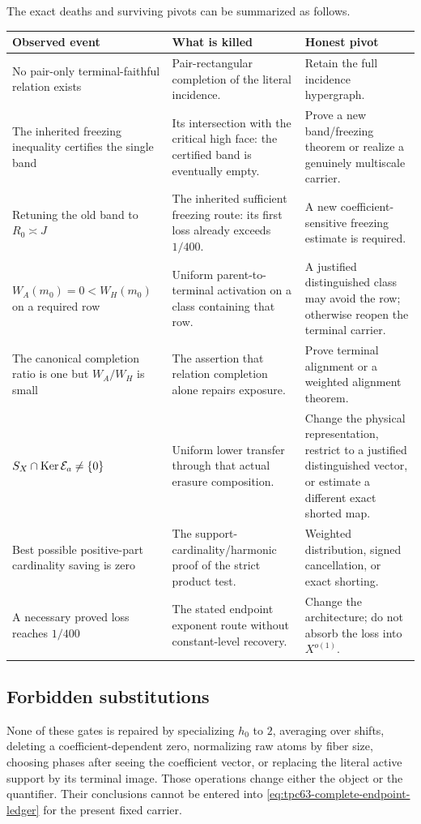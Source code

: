 The exact deaths and surviving pivots can be summarized as follows.
\begin{center}
\small
\begin{tabular}{>{\raggedright\arraybackslash}p{}
                >{\raggedright\arraybackslash}p{}
                >{\raggedright\arraybackslash}p{}}
\toprule
Observed event & What is killed & Honest pivot\\
\midrule
No pair-only terminal-faithful relation exists
& Pair-rectangular completion of the literal incidence.
& Retain the full incidence hypergraph.\\
\addlinespace
The inherited freezing inequality certifies the single band
& Its intersection with the critical high face: the certified band is
  eventually empty.
& Prove a new band/freezing theorem or realize a genuinely multiscale
  carrier.\\
\addlinespace
Retuning the old band to \(R_0\asymp J\)
& The inherited sufficient freezing route: its first loss already exceeds
  \(1/400\).
& A new coefficient-sensitive freezing estimate is required.\\
\addlinespace
\(W_A(m_0)=0<W_H(m_0)\) on a required row
& Uniform parent-to-terminal activation on a class containing that row.
& A justified distinguished class may avoid the row; otherwise reopen the
  terminal carrier.\\
\addlinespace
The canonical completion ratio is one but \(W_A/W_H\) is small
& The assertion that relation completion alone repairs exposure.
& Prove terminal alignment or a weighted alignment theorem.\\
\addlinespace
\(S_X\cap\operatorname{Ker}\mathcal E_a\ne\{0\}\)
& Uniform lower transfer through that actual erasure composition.
& Change the physical representation, restrict to a justified
  distinguished vector, or estimate a different exact shorted map.\\
\addlinespace
Best possible positive-part cardinality saving is zero
& The support-cardinality/harmonic proof of the strict product test.
& Weighted distribution, signed cancellation, or exact shorting.\\
\addlinespace
A necessary proved loss reaches \(1/400\)
& The stated endpoint exponent route without constant-level recovery.
& Change the architecture; do not absorb the loss into \(X^{o(1)}\).\\
\bottomrule
\end{tabular}
\end{center}

\subsection{Forbidden substitutions}

None of these gates is repaired by specializing \(h_0\) to \(2\),
averaging over shifts, deleting a coefficient-dependent zero, normalizing
raw atoms by fiber size, choosing phases after seeing the coefficient
vector, or replacing the literal active support by its terminal image.
Those operations change either the object or the quantifier.  Their
conclusions cannot be entered into
\eqref{eq:tpc63-complete-endpoint-ledger} for the present fixed carrier.
